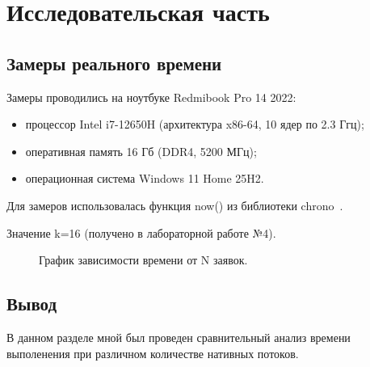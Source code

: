 \chapter{Исследовательская часть}

\section{Замеры реального времени}


Замеры проводились на ноутбуке Redmibook Pro 14 2022:
\begin{itemize}
	\item процессор Intel i7-12650H (архитектура x86-64, 10 ядер по 2.3 Ггц);
	\item оперативная память 16 Гб (DDR4, 5200 МГц);
	\item операционная система Windows 11 Home 25H2.
\end{itemize}
Для замеров использовалась функция now() из библиотеки chrono~\cite[с.~705]{lit1}.

Значение k=16 (получено в лабораторной работе №4). 

\begin{figure}[!htbp]
	\centering
	\caption{График зависимости времени от N заявок.}
\end{figure}

\section*{Вывод}

В данном разделе мной был проведен сравнительный анализ времени выполенения при различном количестве нативных потоков. 

\clearpage
